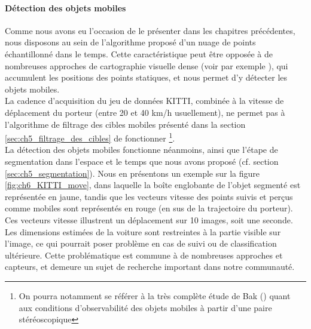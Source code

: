 \paragraph{Détection des objets mobiles}
Comme nous avons eu l'occasion de le présenter dans les chapitres précédentes, nous disposons au sein de l'algorithme proposé d'un nuage de points échantillonné dans le temps. Cette caractéristique peut être opposée à de nombreuses approches de cartographie visuelle dense (voir par exemple \cite{Pollefeys2007, Meilland2011, Lategahn2011, Whelan2013}), qui accumulent les positions des points statiques, et nous permet d'y détecter les objets mobiles.\\
La cadence d'acquisition du jeu de données KITTI, combinée à la vitesse de déplacement du porteur (entre 20 et 40 km/h usuellement), ne permet pas à l'algorithme de filtrage des cibles mobiles présenté dans la section \ref{sec:ch5_filtrage_des_cibles} de fonctionner \footnote{On pourra notamment se référer à la très complète étude de Bak (\cite{Bak2011}) quant aux conditions d'observabilité des objets mobiles à partir d'une paire stéréoscopique}.\\
La détection des objets mobiles fonctionne néanmoins, ainsi que l'étape de segmentation dans l'espace et le temps que nous avons proposé (cf. section \ref{sec:ch5_segmentation}). Nous en présentons un exemple sur la figure \ref{fig:ch6_KITTI_move}, dans laquelle la boîte englobante de l'objet segmenté est représentée en jaune, tandis que les vecteurs vitesse des points suivis et perçus comme mobiles sont représentés en rouge (en sus de la trajectoire du porteur). Ces vecteurs vitesse illustrent un déplacement sur 10 images, soit une seconde. Les dimensions estimées de la voiture sont restreintes à la partie visible sur l'image, ce qui pourrait poser problème en cas de suivi ou de classification ultérieure. Cette problématique est commune à de nombreuses approches et capteurs, et demeure un sujet de recherche important dans notre communauté.

